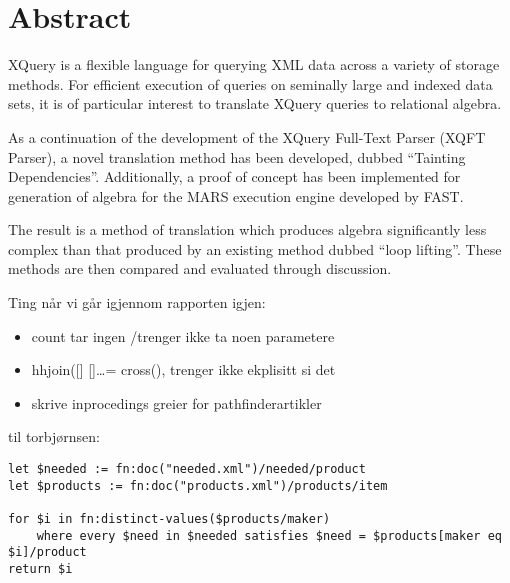 \chapter*{Abstract}
XQuery is a flexible language for querying XML data across a variety of storage
methods. For efficient execution of queries on seminally large and indexed data
sets, it is of particular interest to translate XQuery queries to relational
algebra.

As a continuation of the development of the XQuery Full-Text Parser (XQFT
Parser)\cite{ourselves}, a novel translation method has been developed, dubbed
``Tainting Dependencies''. Additionally, a proof of concept has been
implemented for generation of algebra for the MARS execution engine developed
by FAST.

The result is a method of translation which produces algebra significantly less
complex than that produced by an existing method dubbed ``loop lifting''. These
methods are then compared and evaluated through discussion.


Ting n\aa r vi g\aa r igjennom rapporten igjen:
\begin{itemize}
  \item count tar ingen /trenger ikke ta noen parametere
  \item hhjoin([] []\ldots = cross(), trenger ikke ekplisitt si det
  \item skrive inprocedings greier for pathfinderartikler
\end{itemize}

til torbj\o rnsen:
\begin{verbatim}
let $needed := fn:doc("needed.xml")/needed/product
let $products := fn:doc("products.xml")/products/item

for $i in fn:distinct-values($products/maker) 
    where every $need in $needed satisfies $need = $products[maker eq $i]/product
return $i

\end{verbatim}